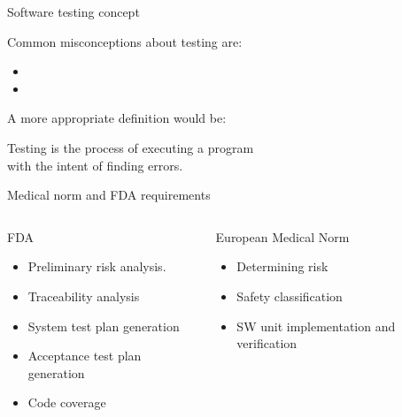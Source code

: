 \documentclass{beamer}
\begin{document}
\begin{frame}{Software testing concept}

Common \alert{misconceptions} about testing are:
\begin{definition}
  \begin{itemize}
    \item<1->
    \item<2->
   \end{itemize}
\end{definition}
A more appropriate definition would be\cite{Glenford04}:
\begin{definition}
  Testing is the process of executing a program\\
  with the intent of finding errors.
\end{definition}
\end{frame}

\begin{frame}{Medical norm and FDA requirements}
  \begin{columns}

    \begin{block}{FDA\cite{FDA02}}
    \begin{itemize}
      \item Preliminary risk analysis.
      \item Traceability analysis
      \item System test plan generation
      \item Acceptance test plan generation
      \item Code coverage
    \end{itemize}
    \end{block}

    \begin{block}{European Medical Norm\cite{IEC06}}
    \begin{itemize}
      \item Determining risk
      \item Safety classification
      \item SW unit implementation and verification
    \end{itemize}
    \end{block}

  \end{columns}
\end{frame}
\end{document}
